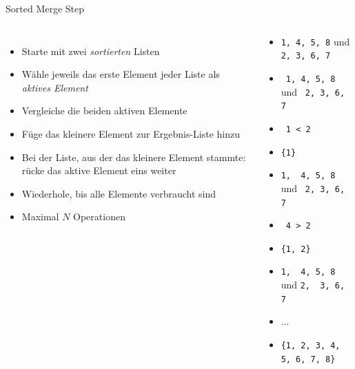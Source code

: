 
\begin{frame}[fragile]{Sorted Merge Step}
%
\begin{columns}
\begin{itemize}
\item Starte mit zwei \emph{sortierten} Listen
\item Wähle jeweils das erste Element jeder Liste als \emph{aktives Element}
\item Vergleiche die beiden aktiven Elemente
\item Füge das kleinere Element zur Ergebnis-Liste hinzu
\item Bei der Liste, aus der das kleinere Element stammte: rücke das aktive Element eins weiter
\item Wiederhole, bis alle Elemente verbraucht sind
\item[\Thus] Maximal $N$ Operationen
\end{itemize}
%
\begin{tcolorbox}
\begin{itemize}
\item \texttt{1, 4, 5, 8} und \texttt{2, 3, 6, 7}
\item \texttt{{\color{red} 1}, 4, 5, 8} und \texttt{{\color{red} 2}, 3, 6, 7}
\item \texttt{{\color{red} 1} < {\color{red}2}}
\item \texttt{\{1\}}
\item \texttt{1, {\color{red} 4}, 5, 8} und \texttt{{\color{red} 2}, 3, 6, 7}
\item \texttt{{\color{red} 4} > {\color{red}2}}
\item \texttt{\{1, 2\}}
\item \texttt{1, {\color{red} 4}, 5, 8} und \texttt{2, {\color{red} 3}, 6, 7}
\item ...
\item \texttt{\{1, 2, 3, 4, 5, 6, 7, 8\}}
\end{itemize}
\end{tcolorbox}
\end{columns}
%
\end{frame}


